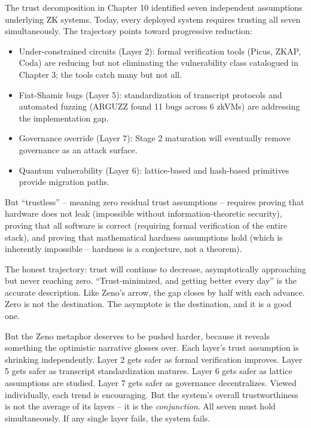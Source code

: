 \documentclass[
  11pt,
  openany]{report}
\providecommand{\tightlist}{%
  \setlength{\itemsep}{0pt}\setlength{\parskip}{0pt}}
\begin{document}
The trust decomposition in Chapter 10 identified seven independent assumptions
underlying ZK systems. Today, every deployed system requires trusting all seven
simultaneously. The trajectory points toward progressive reduction:

\begin{itemize}
\tightlist
\item
  Under-constrained circuits (Layer 2): formal verification tools (Picus, ZKAP,
  Coda) are reducing but not eliminating the vulnerability class catalogued in
  Chapter 3; the tools catch many but not all.
\item
  Fiat-Shamir bugs (Layer 5): standardization of transcript protocols and
  automated fuzzing (ARGUZZ found 11 bugs across 6 zkVMs) are addressing the
  implementation gap.
\item
  Governance override (Layer 7): Stage 2 maturation will eventually remove
  governance as an attack surface.
\item
  Quantum vulnerability (Layer 6): lattice-based and hash-based primitives
  provide migration paths.
\end{itemize}

But ``trustless'' -- meaning zero residual trust assumptions -- requires proving
that hardware does not leak (impossible without information-theoretic security),
proving that all software is correct (requiring formal verification of the
entire stack), and proving that mathematical hardness assumptions hold (which is
inherently impossible -- hardness is a conjecture, not a theorem).

The honest trajectory: trust will continue to decrease, asymptotically
approaching but never reaching zero. ``Trust-minimized, and getting better every
day'' is the accurate description. Like Zeno's arrow, the gap closes by half
with each advance. Zero is not the destination. The asymptote is the
destination, and it is a good one.

But the Zeno metaphor deserves to be pushed harder, because it reveals something
the optimistic narrative glosses over. Each layer's trust assumption is
shrinking independently. Layer 2 gets safer as formal verification improves.
Layer 5 gets safer as transcript standardization matures. Layer 6 gets safer as
lattice assumptions are studied. Layer 7 gets safer as governance decentralizes.
Viewed individually, each trend is encouraging. But the system's overall
trustworthiness is not the average of its layers -- it is the
\emph{conjunction}. All seven must hold simultaneously. If any single layer
fails, the system fails.
\end{document}
